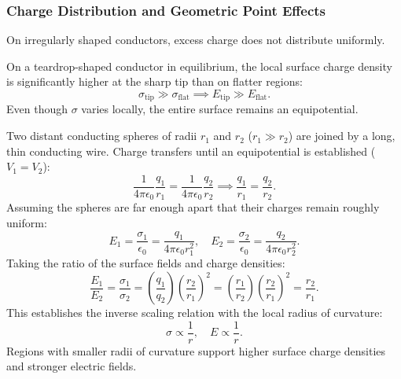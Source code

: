 \subsubsection{Charge Distribution and Geometric Point Effects}

On irregularly shaped conductors, excess charge does not distribute uniformly.

\begin{example}
    On a teardrop-shaped conductor in equilibrium, the local surface charge density is significantly higher at the sharp tip than on flatter regions:
    \begin{equation}
        \sigma_{\text{tip}} \gg \sigma_{\text{flat}} \implies E_{\text{tip}} \gg E_{\text{flat}}.
    \end{equation}
    Even though \(\sigma\) varies locally, the entire surface remains an equipotential.
\end{example}

\begin{example}
    Two distant conducting spheres of radii \(r_1\) and \(r_2\) (\(r_1 \gg r_2\)) are joined by a long, thin conducting wire. Charge transfers until an equipotential is established (\(V_1 = V_2\)):
    \begin{equation}
        \frac{1}{4\pi\epsilon_0}\frac{q_1}{r_1} = \frac{1}{4\pi\epsilon_0}\frac{q_2}{r_2} \implies \frac{q_1}{r_1} = \frac{q_2}{r_2}.
    \end{equation}
    Assuming the spheres are far enough apart that their charges remain roughly uniform:
    \begin{equation}
        E_1 = \frac{\sigma_1}{\epsilon_0} = \frac{q_1}{4\pi\epsilon_0 r_1^2}, \quad E_2 = \frac{\sigma_2}{\epsilon_0} = \frac{q_2}{4\pi\epsilon_0 r_2^2}.
    \end{equation}
    Taking the ratio of the surface fields and charge densities:
    \begin{equation}
        \frac{E_1}{E_2} = \frac{\sigma_1}{\sigma_2} = \left(\frac{q_1}{q_2}\right)\left(\frac{r_2}{r_1}\right)^2 = \left(\frac{r_1}{r_2}\right)\left(\frac{r_2}{r_1}\right)^2 = \frac{r_2}{r_1}.
    \end{equation}
    This establishes the inverse scaling relation with the local radius of curvature:
    \begin{equation}
        \sigma \propto \frac{1}{r}, \quad E \propto \frac{1}{r}.
    \end{equation}
    Regions with smaller radii of curvature support higher surface charge densities and stronger electric fields.
\end{example}

